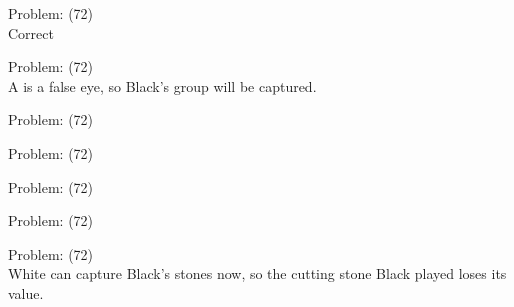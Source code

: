 \documentclass[11pt]{article}
\begin{document}
\begin{minipage}[t]{0.5\textwidth}
  {\centering
  
  Problem: (72)\\
  Correct\\
  }
\end{minipage}
\begin{minipage}[t]{0.5\textwidth}
  {\centering
  
  Problem: (72)\\
  A is a false eye, so Black's group will be captured.\\
  }
\end{minipage}
\begin{minipage}[t]{0.5\textwidth}
  {\centering
  
  Problem: (72)\\
  
  }
\end{minipage}
\begin{minipage}[t]{0.5\textwidth}
  {\centering
  
  Problem: (72)\\
  
  }
\end{minipage}
\begin{minipage}[t]{0.5\textwidth}
  {\centering
  
  Problem: (72)\\
  
  }
\end{minipage}
\begin{minipage}[t]{0.5\textwidth}
  {\centering
  
  Problem: (72)\\
  
  }
\end{minipage}
\begin{minipage}[t]{0.5\textwidth}
  {\centering
  
  Problem: (72)\\
  White can capture Black's stones now, so the cutting stone Black played loses its value.\\
  }
\end{minipage}
\end{document}
